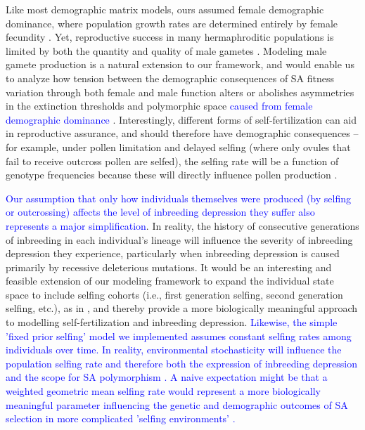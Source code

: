 \documentclass[11pt]{article}
\begin{document}
Like most demographic matrix models, ours assumed female demographic dominance, where population growth rates are determined entirely by female fecundity \citep{pollard1975mathematical,Caswell2001,iannelli2005gender}. Yet, reproductive success in many hermaphroditic populations is limited by both the quantity and quality of male gametes \citep[e.g.,][]{Yund2000, AizenHarder2007, Harder2016}. Modeling male gamete production is a natural extension to our framework, and would enable us to analyze how tension between the demographic consequences of SA fitness variation through both female and male function alters or abolishes asymmetries in the extinction thresholds and polymorphic space \textcolor{blue}{caused from female demographic dominance} \citep[e.g.,][]{Tazzyman2015}.  Interestingly, different forms of self-fertilization can aid in reproductive assurance, and should therefore have demographic consequences -- for example, under pollen limitation and delayed selfing (where only ovules that fail to receive outcross pollen are selfed), the selfing rate will be a function of genotype frequencies because these will directly influence pollen production \citep{HarderBarrett2006}.

\textcolor{blue}{Our assumption that only how individuals themselves were produced (by selfing or outcrossing) affects the level of inbreeding depression they suffer also represents a major simplification}. In reality, the history of consecutive generations of inbreeding in each individual's lineage will influence the severity of inbreeding depression they experience, particularly when inbreeding depression is caused primarily by recessive deleterious mutations. It would be an interesting and feasible extension of our modeling framework to expand the individual state space to include selfing cohorts (i.e., first generation selfing, second generation selfing, etc.), as in \citet{kelly1999response,kelly2007mutation}, and thereby provide a more biologically meaningful approach to modelling self-fertilization and inbreeding depression. \textcolor{blue}{Likewise, the simple 'fixed prior selfing' model we implemented assumes constant selfing rates among individuals over time. In reality, environmental stochasticity will influence the population selfing rate and therefore both the expression of inbreeding depression and the scope for SA polymorphism \citep{JordanConnallon2014,Olito-etal-2018}. A naive expectation might be that a weighted geometric mean selfing rate would represent a more biologically meaningful parameter influencing the genetic and demographic outcomes of SA selection in more complicated 'selfing environments' \citep[e.g., ][]{ConnallonSharmaOlito2019}.}
\end{document}
